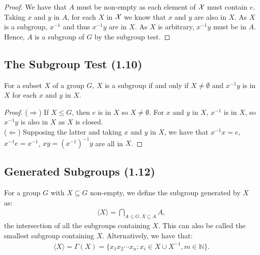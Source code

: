 \begin{proof} We have that $A$ must be non-empty as each element of $\mathcal{X}$
    must contain $e$. Taking $x$ and $y$ in $A$, for each $X$ in $\mathcal{X}$
    we know that $x$ and $y$ are also in $X$. As $X$ is a subgroup, $x^{-1}$ and
    thus $x^{-1}y$ are in $X$. As $X$ is arbitrary, $x^{-1}y$ must be in $A$.
    Hence, $A$ is a subgroup of $G$ by the subgroup test.
\end{proof}

\subsection{The Subgroup Test (1.10)} \label{1.10}

For a subset $X$ of a group $G$, $X$ is a subgroup if and only if 
$X \neq \emptyset$ and $x^{-1}y$ is in $X$ for each $x$ and $y$ in $X$.

\begin{proof}
    ($\Longrightarrow$) If $X \leq G$, then $e$ is in $X$ so 
    $X \neq \emptyset$. For $x$ and $y$ in $X$, $x^{-1}$ is 
    in $X$, so $x^{-1}y$ is also in $X$ as $X$ is closed.
    \\[\baselineskip]
    ($\Longleftarrow$) Supposing the latter and taking $x$ and $y$ 
    in $X$, we have that $x^{-1}x = e$, \linebreak
    $x^{-1}e = x^{-1}$,
    $xy = (x^{-1})^{-1}y$ are all in $X$.
\end{proof}

\newpage

\subsection{Generated Subgroups (1.12)} \label{1.12}

For a group $G$ with $X \subseteq G$ non-empty, we define the subgroup generated by $X$ as:
\begin{align*}
    \langle X \rangle = \bigcap_{A \leq G, X \subseteq A} A,
\end{align*} the intersection of all the subgroups containing $X$.
This can also be called the smallest subgroup containing $X$.
Alternatively, we have that: \begin{align*}
    \langle X \rangle = \Gamma(X) = \{x_1 x_2 \cdots x_n : x_i \in X \cup X^{-1}, m \in \mathbb{N} \}.
\end{align*}

